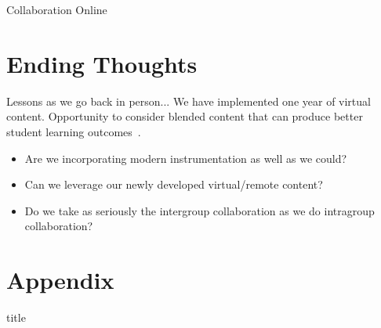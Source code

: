 \documentclass{beamer}
\begin{document}
\begin{frame}{Collaboration Online}
  \begin{center}
  \end{center}
\end{frame}

\section{Ending Thoughts}

\begin{frame}{Lessons as we go back in person...}
  We have implemented one year of virtual content.
  \pause
  Opportunity to consider blended content that can produce better student learning outcomes~\cite{Bumbacher2017, Olympiou2011}.
  \pause
  \begin{itemize}
    \item{
      Are we incorporating modern instrumentation as well as we could?
    }
    \item{
      Can we leverage our newly developed virtual/remote content?
    }
    \item{
      Do we take as seriously the intergroup collaboration as we do intragroup collaboration?
    }
  \end{itemize}
\end{frame}

\section{Appendix}

\begin{frame}
  \vfill
  \centering
  \begin{beamercolorbox}[sep=8pt,center,shadow=false,rounded=false]{title}
    \insertsectionhead\par%
  \end{beamercolorbox}
  \vfill
\end{frame}
\end{document}
